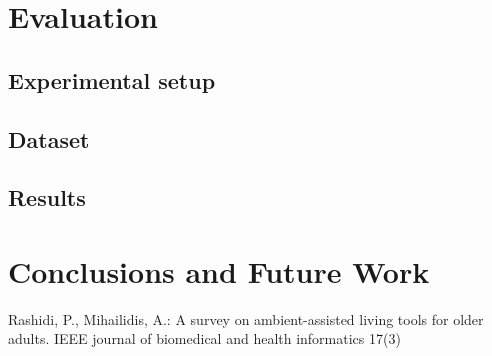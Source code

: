 \documentclass[10pt,letterpaper,oneside,draft]{article}
\begin{document}

\section{Evaluation}
\subsection{Experimental setup}
\subsection{Dataset}
\subsection{Results}




\section{Conclusions and Future Work}

\begin{thebibliography}{10}

Rashidi, P., Mihailidis, A.: {A survey on ambient-assisted living tools for
  older adults.} IEEE journal of biomedical and health informatics  17(3)

\end{thebibliography}
\end{document}
